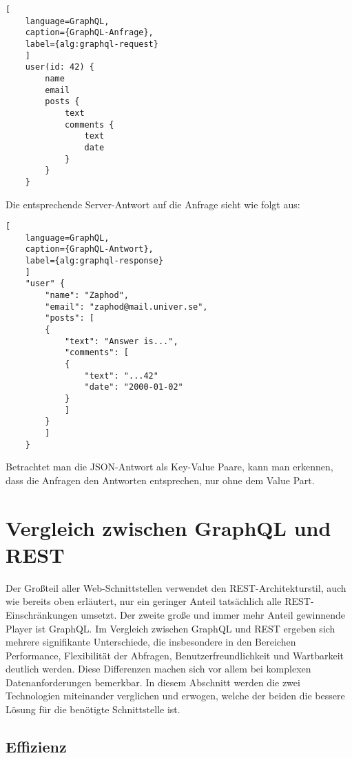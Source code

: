 \documentclass[draft,final]{vutinfth} %
\begin{document}
\newpage
\begin{lstlisting}[
	language=GraphQL, 
	caption={GraphQL-Anfrage}, 
	label={alg:graphql-request}
	]
	user(id: 42) {
		name
		email
		posts {
			text
			comments {
				text
				date
			}
		}
	}
\end{lstlisting}

Die entsprechende Server-Antwort auf die Anfrage sieht wie folgt aus:

\begin{lstlisting}[
	language=GraphQL, 
	caption={GraphQL-Antwort}, 
	label={alg:graphql-response}
	]
	"user" {
		"name": "Zaphod",
		"email": "zaphod@mail.univer.se",
		"posts": [
		{
			"text": "Answer is...",
			"comments": [
			{
				"text": "...42"
				"date": "2000-01-02"
			}
			]
		}
		]
	}
\end{lstlisting}

Betrachtet man die JSON-Antwort als Key-Value Paare, kann man erkennen, dass die Anfragen den Antworten entsprechen, nur ohne dem Value Part.


\section{Vergleich zwischen GraphQL und REST}

Der Großteil aller Web-Schnittstellen verwendet den REST-Architekturstil, auch wie bereits oben erläutert, nur ein geringer Anteil tatsächlich alle REST-Einschränkungen umsetzt.
Der zweite große und immer mehr Anteil gewinnende Player ist GraphQL.
Im Vergleich zwischen GraphQL und REST ergeben sich mehrere signifikante Unterschiede, die insbesondere in den Bereichen Performance, Flexibilität der Abfragen, Benutzerfreundlichkeit und Wartbarkeit deutlich werden. 
Diese Differenzen machen sich vor allem bei komplexen Datenanforderungen bemerkbar.
In diesem Abschnitt werden die zwei Technologien miteinander verglichen und erwogen, welche der beiden die bessere Lösung für die benötigte Schnittstelle ist.


\subsection{Effizienz}
\end{document}
